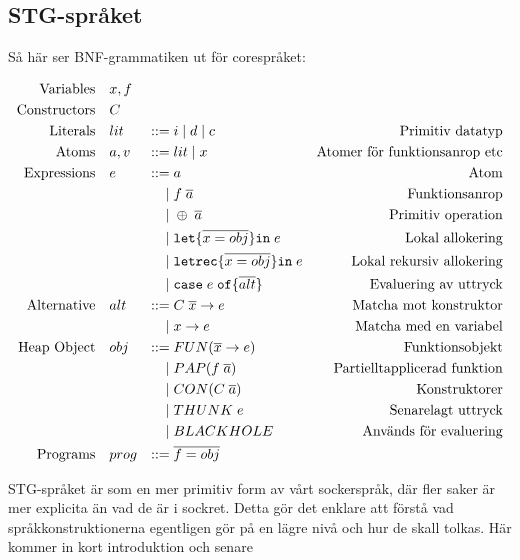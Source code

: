 \documentclass[../Core]{subfiles}
\begin{document}
\subsection{STG-språket}


Så här ser BNF-grammatiken ut för corespråket:


\begin{equation*}
\begin{aligned}
\text{Variables} \quad & x,f \\
\text{Constructors} \quad & C \\
\text{Literals}\quad&lit&::=&\;i \; | \;  d \;|\; c&\text{Primitiv datatyp} \\
\text{Atoms}\quad&a, v&::=&\;lit \; | \; x&\text{Atomer för funktionsanrop etc} \\
\text{Expressions}\quad&e&::=&\;a&\text{Atom} \\
    &&|&\;f \; \overline{a}&\text{Funktionsanrop} \\
    &&|&\;\oplus \; \overline{a}&\text{Primitiv operation} \\
    &&|&\;\mathtt{let \{} \overline{x = obj} \mathtt{ \} in } \; e&\text{Lokal allokering} \\
    &&|&\;\mathtt{letrec \{} \overline{x = obj} \mathtt{ \} in } \; e&\text{Lokal rekursiv allokering} \\
    &&|&\;\mathtt{case} \; e \;  \mathtt{ of \{ } \overline{alt} \mathtt{\}}&\text{Evaluering av uttryck} \\
\text{Alternative}\quad&alt&::=&\;C \; \overline{x} \rightarrow e&\text{Matcha mot konstruktor} \\
    &&|&\;x \rightarrow e&\text{Matcha med en variabel} \\
\text{Heap Object}\quad&obj&::=&\;FUN(\overline{x} \rightarrow e)&\text{Funktionsobjekt} \\
    &&|&\;PAP(f \; \overline{a})&\text{Partielltapplicerad funktion} \\
    &&|&\;CON(C \; \overline{a})&\text{Konstruktorer} \\
    &&|&\;THUNK \; e&\text{Senarelagt uttryck} \\
    &&|&\;BLACKHOLE&\text{Används för evaluering} \\
\text{Programs}\quad&prog&::=&\;\overline{f=obj}&\text{}
\end{aligned}
\end{equation*}

STG-språket är som en mer primitiv form av vårt sockerspråk, där fler saker är mer explicita
än vad de är i sockret. Detta gör det enklare
att förstå vad språkkonstruktionerna egentligen gör på en lägre nivå och hur de skall tolkas. Här kommer in kort introduktion
och senare 
\end{document}
